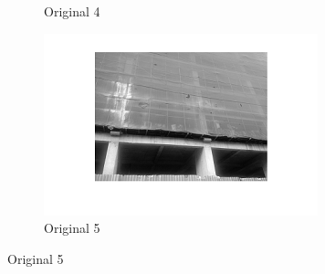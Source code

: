 \begin{center}
\begin{figure}[h]
\begin{subfigure}[b]{0.18\textwidth}
                 \caption{Original 4}
                  \label{fig:original 4}
        \end{subfigure}
        \begin{subfigure}[b]{0.18\textwidth}
                        \includegraphics[width=\linewidth]{construction5.png}
                         \caption{Original 5}
                          \label{fig:original 5}
                \end{subfigure}
      \end{figure}
	
\end{center}
\vspace{2cm}

